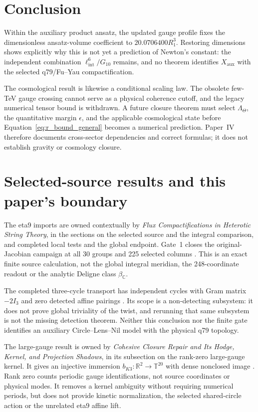 \documentclass[11pt]{article}
\begin{document}
\section{Conclusion}

Within the auxiliary product ansatz, the updated gauge profile fixes the
dimensionless ansatz-volume coefficient to
$20.0706400R_1^3$. Restoring dimensions shows explicitly why this is not yet a
prediction of Newton's constant: the independent combination
$\ell_{\mathrm{int}}^6/G_{10}$ remains, and no theorem identifies
$X_{\mathrm{aux}}$ with the selected q79/Fu--Yau compactification.

The cosmological result is likewise a conditional scaling law. The obsolete
few-TeV gauge crossing cannot serve as a physical coherence cutoff, and the
legacy numerical tensor bound is withdrawn. A future closure theorem must
select $\Lambda_\Theta$, the quantitative margin $\epsilon$, and the applicable
cosmological state before Equation~\eqref{eq:r_bound_general} becomes a
numerical prediction. Paper~IV therefore documents cross-sector dependencies
and correct formulas; it does not establish gravity or cosmology closure.

\section{Selected-source results and this paper's boundary}
\label{sec:theta-source-consumers}

The eta9 imports are owned contextually by \emph{Flux Compactifications in
Heterotic String Theory}, in the sections on the selected source and the
integral comparison, and completed local tests and the global endpoint.
Gate~1 closes the original-Jacobian campaign at all 30 groups and 225 selected
columns \cite{ThetaGate1}. This is an exact finite source calculation, not
the global integral meridian, the 248-coordinate readout or the analytic
Deligne class $\beta_{\mathbb C}$.

The completed three-cycle transport has independent cycles with Gram matrix
$-2I_3$ and zero detected affine pairings \cite{ThetaCycles}. Its scope is
a non-detecting subsystem: it does not prove global triviality of the twist,
and rerunning that same subsystem is not the missing detection theorem.
Neither this conclusion nor the finite gate identifies an auxiliary
Circle--Lens--Nil model with the physical q79 topology.

The large-gauge result is owned by \emph{Cohesive Closure Repair and Its
Hodge, Kernel, and Projection Shadows}, in its subsection on the rank-zero
large-gauge kernel. It gives an injective immersion
$b_{K3}:\mathbb R^2\to\mathbb T^{20}$ with dense nonclosed image
\cite{ThetaBK3}. Rank zero counts periodic gauge identifications, not source
coordinates or physical modes. It removes a kernel ambiguity without
requiring numerical periods, but does not provide kinetic normalization,
the selected shared-circle action or the unrelated eta9 affine lift.
\end{document}
